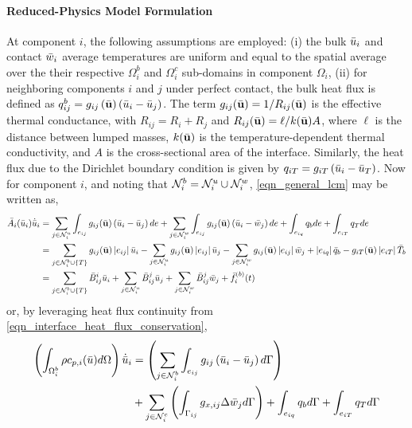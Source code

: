 \paragraph*{Reduced-Physics Model Formulation} At component $i$, the following assumptions are employed: (i) the bulk $\bar{u}_i$ and contact $\bar{w}_i$ average temperatures are uniform and equal to the spatial average over the their respective $\Omega_i^b$ and $\Omega_i^{c}$ sub-domains in component $\Omega_i$, (ii) for neighboring components $i$ and $j$ under perfect contact, the bulk heat flux is defined as $q_{ij}^{b} = g_{ij}\left(\bar{\mathbf{u}}\right)\left(\bar{u}_i - \bar{u}_j\right)$. The term $g_{ij}(\bar{\mathbf{u}}) = 1 / R_{ij}(\bar{\mathbf{u}})$ is the effective thermal conductance, with $R_{ij} = R_{i} + R_{j}$ and $R_{ij}(\bar{\mathbf{u}}) = \ell/k(\bar{\mathbf{u}})A$, where $\ell$ is the distance between lumped masses, $k(\bar{\mathbf{u}})$ is the temperature-dependent thermal conductivity, and $A$ is the cross-sectional area of the interface. Similarly, the heat flux due to the Dirichlet boundary condition is given by $q_{iT} = g_{iT}\left(\bar{u}_i - \bar{u}_T\right)$. Now for component $i$, and noting that $\mathcal{N}_i^b = \mathcal{N}_i^u\cup\mathcal{N}_i^w$, \cref{eqn_general_lcm} may be written as,
\begin{subequations}
    \begin{align}
        \bar{A}_i(\bar{u}_i)\dot{\bar{u}}_i &=\sum_{j\in\mathcal{N}^u_i}\int_{e_{ij}}g_{ij}(\bar{\mathbf{u}})\left(\bar{u}_i - \bar{u}_j\right)de + \sum_{j\in\mathcal{N}_i^w}\int_{e_{ij}}g_{ij}(\bar{\mathbf{u}})\left(\bar{u}_i - \bar{w}_j\right)de + \int_{e_{iq}}q_b de + \int_{e_{iT}}q_{T}de\\
        &= \sum_{j\in\mathcal{N}_i^b\cup\left\{T\right\}}g_{ij}(\bar{\mathbf{u}})\left|e_{ij}\right|\bar{u}_i - \sum_{j\in\mathcal{N}_i^u}g_{ij}(\bar{\mathbf{u}})\left|e_{ij}\right|\bar{u}_j - \sum_{j\in\mathcal{N}_i^w}g_{ij}(\bar{\mathbf{u}})\left|e_{ij}\right|\bar{w}_j + \left|e_{iq}\right|\bar{q}_b - g_{iT}(\bar{\mathbf{u}})\left|e_{iT}\right|\bar{T}_b\\
        &= \sum_{j\in\mathcal{N}_i^{b}\cup\left\{T\right\}}\bar{B}_{ij}^{i}\bar{u}_i + \sum_{j\in\mathcal{N}_i^u}\bar{B}_{ij}^{j}\bar{u}_j + \sum_{j\in\mathcal{N}_i^w}\bar{B}_{ij}^{j}\bar{w}_j + \bar{f}_i^{(b)}(t)
    \end{align}
\end{subequations}
or, by leveraging heat flux continuity from \cref{eqn_interface_heat_flux_conservation},
\begin{align}
     \left(\int_{\Omega^{b}_i}\rho c_{p,i}(\bar{u}) d\Omega\right)\dot{\bar{u}}_i &= \left(\sum_{j\in\mathcal{N}^b_i}\int_{e_{ij}}g_{ij}\left(\bar{u}_i - \bar{u}_j\right)d\Gamma\right)\\
    &+ \sum_{j\in\mathcal{N}_i^{c}}\left(\int_{\Gamma_{ij}}g_{x,ij}\Delta\bar{w}_j d\Gamma\right) + \int_{e_{iq}}q_b d\Gamma + \int_{e_{iT}}q_{T}d\Gamma
\end{align}

